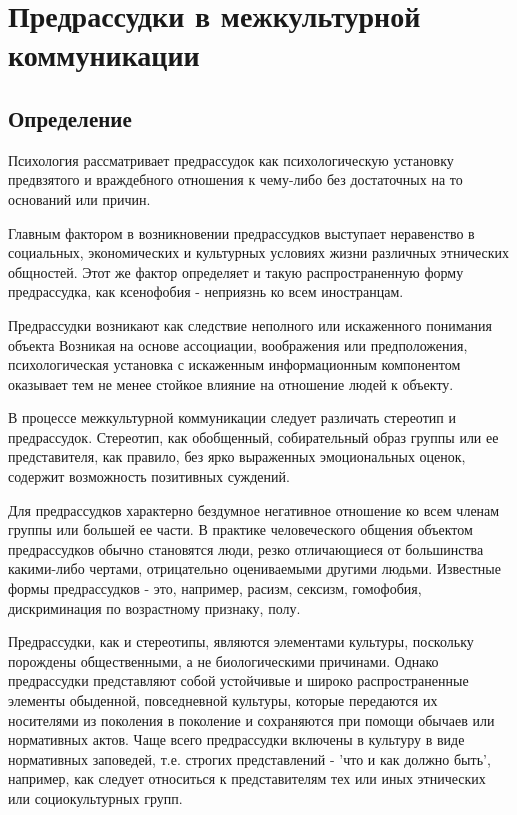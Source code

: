 \documentclass[14pt, a4paper] {ncc}
\begin{document}
\section{Предрассудки в межкультурной коммуникации}

	\subsection{Определение}
Психология рассматривает предрассудок как психологическую установку
предвзятого и враждебного отношения к чему-либо без достаточных на то оснований
или причин.

Главным фактором в возникновении предрассудков выступает неравенство в
социальных, экономических и культурных условиях жизни различных этнических
общностей. Этот же фактор определяет и такую распространенную форму
предрассудка, как ксенофобия - неприязнь ко всем иностранцам.

Предрассудки возникают как следствие неполного или искаженного понимания
объекта Возникая на основе ассоциации, воображения или предположения,
психологическая установка с искаженным информационным компонентом оказывает
тем не менее стойкое влияние на отношение людей к объекту.

В процессе межкультурной коммуникации следует различать стереотип и
предрассудок. Стереотип, как обобщенный, собирательный образ группы или ее
представителя, как правило, без ярко выраженных эмоциональных оценок, содержит
возможность позитивных суждений.

Для предрассудков характерно бездумное негативное отношение ко всем членам
группы или большей ее части. В практике человеческого общения объектом
предрассудков обычно становятся люди, резко отличающиеся от большинства
какими-либо чертами, отрицательно оцениваемыми другими людьми. Известные
формы предрассудков - это, например, расизм, сексизм, гомофобия,
дискриминация по возрастному признаку, полу.

Предрассудки, как и стереотипы, являются элементами культуры, поскольку
порождены общественными, а не биологическими причинами. Однако предрассудки
представляют собой устойчивые и широко распространенные элементы обыденной,
повседневной культуры, которые передаются их носителями из поколения в
поколение и сохраняются при помощи обычаев или нормативных актов. Чаще всего
предрассудки включены в культуру в виде нормативных заповедей, т.е. строгих
представлений - 'что и как должно быть', например, как следует относиться
к представителям тех или иных этнических или социокультурных групп.\cite{Sadoh}
\end{document}
